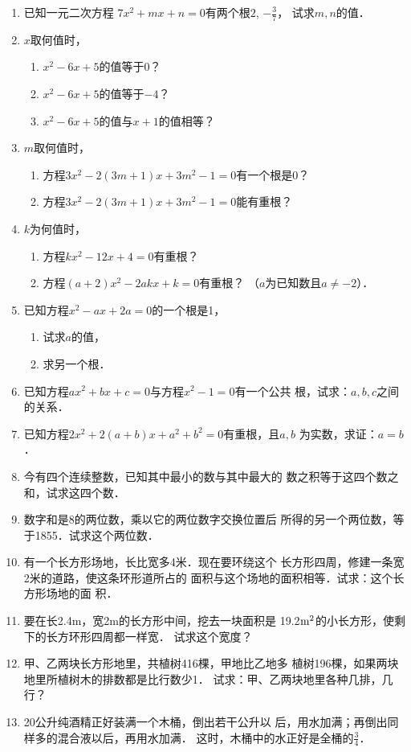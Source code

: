 \begin{enumerate}
\item 已知一元二次方程
$7x^2+mx+n=0$有两个根$2$, $-\frac{3}{7}$，
试求$m,n$的值．

\item $x$取何值时，
\begin{enumerate}
    \item $x^2-6x+5$的值等于0？
    \item $x^2-6x+5$的值等于$-4$？
    \item $x^2-6x+5$的值与$x+1$的值相等？
\end{enumerate}

\item $m$取何值时，
\begin{enumerate}
    \item 方程$3x^2-2(3m+1)x+3m^2-1=0$有一个根是0？
    \item 方程$3x^2-2(3m+1)x+3m^2-1=0$能有重根？
\end{enumerate}

\item $k$为何值时，
\begin{enumerate}
    \item 方程$kx^2-12x+4=0$有重根？
    \item 方程$(a+2)x^2-2akx+k=0$有重根？
（$a$为已知数且$a\ne-2$）．
\end{enumerate}

\item 已知方程$x^2-ax+2a=0$的一个根是1，
\begin{enumerate}
    \item 试求$a$的值，
    \item 求另一个根．
\end{enumerate}

\item 已知方程$ax^2+bx+c=0$与方程$x^2-1=0$有一个公共
根，试求：$a,b,c$之间的关系．
\item 已知方程$2x^2+2(a+b)x+a^2+b^2=0$有重根，且$a,b$
为实数，求证：$a=b$．
\item 今有四个连续整数，已知其中最小的数与其中最大的
数之积等于这四个数之和，试求这四个数．
\item 数字和是8的两位数，乘以它的两位数字交换位置后
所得的另一个两位数，等于1855．试求这个两位数．
\item 有一个长方形场地，长比宽多4米．现在要环绕这个
长方形四周，修建一条宽2米的道路，使这条环形道所占的
面积与这个场地的面积相等．试求：这个长方形场地的面
积．
\item 要在长2.4m，宽2m的长方形中间，挖去一块面积是
19.2${\rm m^2}$的小长方形，使剩下的长方环形四周都一样宽．
试求这个宽度？
\item 甲、乙两块长方形地里，共植树416棵，甲地比乙地多
植树196棵，如果两块地里所植树木的排数都是比行数少1．
试求：甲、乙两块地里各种几排，几行？
\item 20公升纯酒精正好装满一个木桶，倒出若干公升以
后，用水加满；再倒出同样多的混合液以后，再用水加满．
这时，木桶中的水正好是全桶的$\frac{3}{4}$．


\end{enumerate}
